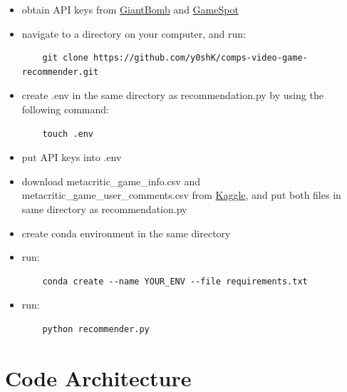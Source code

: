 \documentclass[10pt,twocolumn]{article}
\begin{document}
\begin{itemize}
    \item obtain API keys from \href{https://www.giantbomb.com/api/}{GiantBomb} and \href{https://www.gamespot.com/api/}{GameSpot}
    \item navigate to a directory on your computer, and run: 

    \begin{lstlisting}
    git clone https://github.com/y0shK/comps-video-game-recommender.git
    \end{lstlisting}
    
    \item create .env in the same directory as recommendation.py by using the following command:

    \begin{lstlisting}
    touch .env
    \end{lstlisting}
    
    \item put API keys into .env
    \item download metacritic\_game\_info.csv and metacritic\_game\_user\_comments.csv from \href{https://www.kaggle.com/datasets/dahlia25/metacritic-video-game-comments}{Kaggle}, and put both files in same directory as recommendation.py
    \item create conda environment in the same directory
    \item run:
    \begin{lstlisting}
    conda create --name YOUR_ENV --file requirements.txt
    \end{lstlisting}
    \item run:
    \begin{lstlisting}
    python recommender.py
    \end{lstlisting}
\end{itemize}

\section{Code Architecture}

\end{document}
